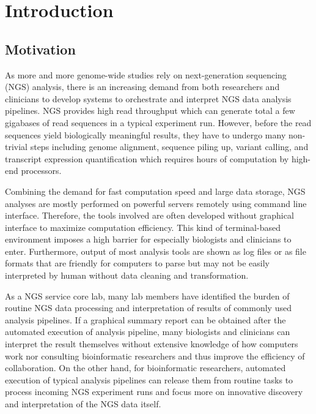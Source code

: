 \chapter{Introduction}
\label{c:intro}

\section{Motivation}
\label{s:motivation}

%
%

As more and more genome-wide studies rely on next-generation sequencing (NGS)
analysis, there is an increasing demand from both researchers and clinicians to
develop systems to orchestrate and interpret NGS data analysis pipelines. NGS
provides high read throughput which can generate total a few gigabases of read
sequences in a typical experiment run. However, before the read sequences yield
biologically meaningful results, they have to undergo many non-trivial steps
including genome alignment, sequence piling up, variant calling, and transcript
expression quantification which requires hours of computation by high-end
processors.

Combining the demand for fast computation speed and large data storage, NGS
analyses are mostly performed on powerful servers remotely using command line
interface. Therefore, the tools involved are often developed without graphical
interface to maximize computation efficiency. This kind of terminal-based
environment imposes a high barrier for especially biologists and clinicians to
enter. Furthermore, output of most analysis tools are shown as log files or as
file formats that are friendly for computers to parse but may not be easily
interpreted by human without data cleaning and transformation.

As a NGS service core lab, many lab members have identified the burden of
routine NGS data processing and interpretation of results of commonly used
analysis pipelines. If a graphical summary report can be obtained after the
automated execution of analysis pipeline, many biologists and clinicians can
interpret the result themselves without extensive knowledge of how computers
work nor consulting bioinformatic researchers and thus improve the efficiency
of collaboration. On the other hand, for bioinformatic researchers, automated
execution of typical analysis pipelines can release them from routine tasks to
process incoming NGS experiment runs and focus more on innovative discovery and
interpretation of the NGS data itself.

